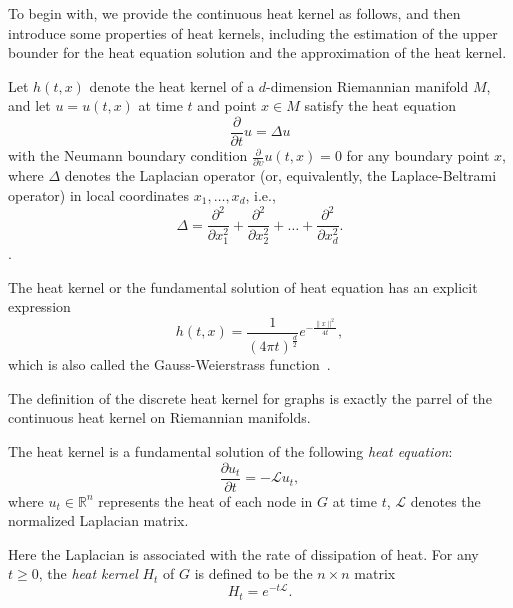 \documentclass[10pt,journal,compsoc]{IEEEtran}
\begin{document}
To begin with, we provide the continuous heat kernel as follows, and then introduce some properties of heat kernels, including the estimation of the upper bounder for the heat equation solution and the approximation of the heat kernel.


\begin{definition}
Let $h(t, x)$ denote the heat kernel of a $d$-dimension Riemannian manifold $M$, and let $u = u(t, x)$ at time $t$ and point $x \in M$ satisfy the heat equation
\begin{equation}
  \frac{\partial}{\partial t} u = \Delta u
\end{equation}
with the Neumann boundary condition $\frac{\partial}{\partial \upsilon} u(t, x) = 0$ for any boundary point $x$, where $\Delta$ denotes the Laplacian operator (or, equivalently, the Laplace-Beltrami operator) in local coordinates $x_{1}, \ldots, x_{d}$, i.e.,
\begin{equation}
  \Delta  = \frac{\partial^{2}}{\partial x_{1}^{2}} + \frac{\partial^{2}}{\partial x_{2}^{2}} + \ldots + \frac{\partial^{2}}{\partial x_{d}^{2}}.
\end{equation}.
\end{definition}


The heat kernel or the fundamental solution of heat equation has an explicit expression
\begin{equation}
  h(t, x) = \frac{1}{(4 \pi t)^{\frac{d}{2}}}e^{-\frac{\|x\|^{2}}{4t}},
\end{equation}
which is also called the Gauss-Weierstrass function~\cite{heat-kernel, diffusion-kernels, sun2009concise-heat-diffusion}.


The definition of the discrete heat kernel for graphs is exactly the parrel of the continuous heat kernel on Riemannian manifolds.
\begin{definition}
The heat kernel is a fundamental solution of the following \emph{heat equation}:
\begin{equation}\label{heat-equation}
     \frac{\partial u_{t}}{\partial t} = - \mathcal{L} u_{t},
\end{equation}
where $u_{t}\in \mathbb{R}^{n}$ represents the heat of each node in $G$ at time $t$, $\mathcal{L}$ denotes the normalized Laplacian matrix.
\end{definition}


Here the Laplacian is associated with the rate of dissipation of heat. For any $t \geq 0$, the \emph{heat kernel} $H_{t}$ of $G$ is defined to be the $n \times n$ matrix
\begin{equation}
     H_{t} = e^{-t \mathcal{L}}.
\end{equation}
\end{document}

